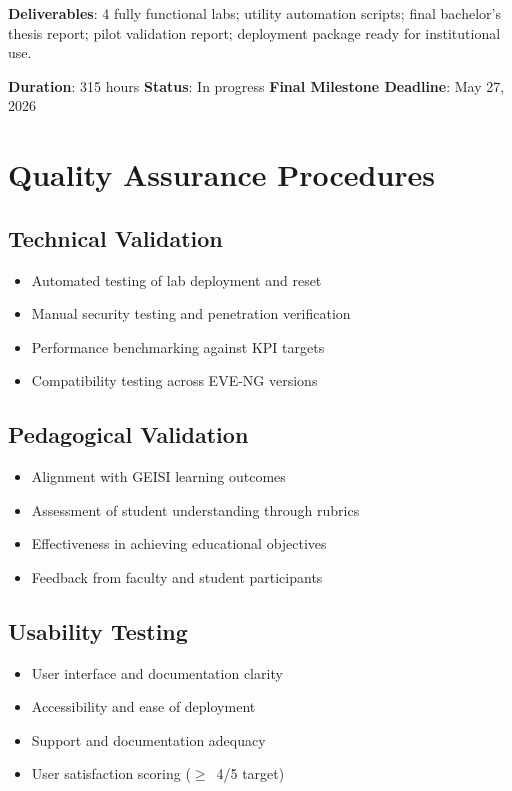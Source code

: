 \textbf{Deliverables}: 4 fully functional labs; utility automation scripts; final
bachelor's thesis report; pilot validation report; deployment package ready for
institutional use.

\textbf{Duration}: 315 hours \quad \textbf{Status}: In progress \quad
\textbf{Final Milestone Deadline}: May 27, 2026

\section{Quality Assurance Procedures}

\subsection{Technical Validation}

\begin{itemize}
\item Automated testing of lab deployment and reset
\item Manual security testing and penetration verification
\item Performance benchmarking against KPI targets
\item Compatibility testing across EVE-NG versions
\end{itemize}

\subsection{Pedagogical Validation}

\begin{itemize}
\item Alignment with GEISI learning outcomes
\item Assessment of student understanding through rubrics
\item Effectiveness in achieving educational objectives
\item Feedback from faculty and student participants
\end{itemize}

\subsection{Usability Testing}

\begin{itemize}
\item User interface and documentation clarity
\item Accessibility and ease of deployment
\item Support and documentation adequacy
\item User satisfaction scoring ($\geq$~4/5 target)
\end{itemize}

